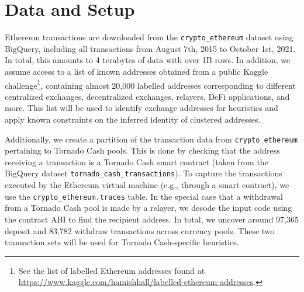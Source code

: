 \section{Data and Setup} \label{sec:data}

Ethereum transactions are downloaded from the \texttt{crypto\_ethereum} dataset using BigQuery, including all transactions from August 7th, 2015 to October 1st, 2021.  In total, this amounts to 4 terabytes of data with over 1B rows.
In addition, we assume access to a list of known addresses obtained from a public Kaggle challenge\footnote{See the list of labelled Ethereum addresses found at \url{https://www.kaggle.com/hamishhall/labelled-ethereum-addresses}.}, containing almost 20,000 labelled addresses corresponding to different centralized exchanges, decentralized exchanges, relayers, DeFi applications, and more.
This list will be used to identify exchange addresses for heuristics and apply known constraints on the inferred identity of clustered addresses.

Additionally, we create a partition of the transaction data from \texttt{crypto\_ethereum} pertaining to Tornado Cash pools. This is done by checking that the address receiving a transaction is a Tornado Cash smart contract (taken from the BigQuery dataset \texttt{tornado\_cash\_transactions}). To capture the transactions executed by the Ethereum virtual machine (e.g., through a smart contract), we use the \texttt{crypto\_ethereum.traces} table. In the special case that a withdrawal from a Tornado Cash pool is made by a relayer, we decode the input code using the contract ABI to find the recipient address. In total, we uncover around 97,365 deposit and 83,782 withdraw transactions across currency pools. These two transaction sets will be used for Tornado Cash-specific heuristics.